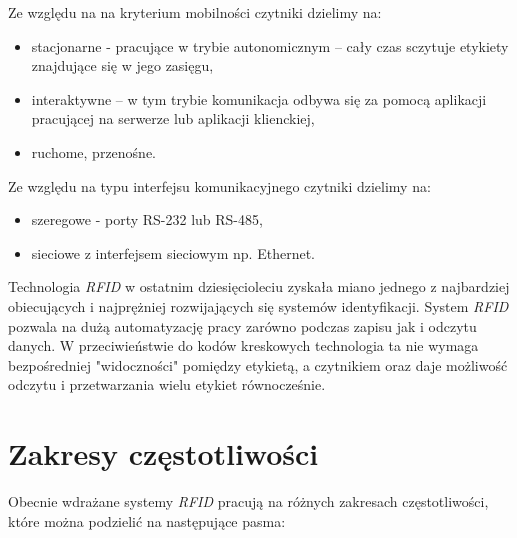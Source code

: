 \noindent 
\newline Ze względu na na kryterium mobilności czytniki dzielimy na:

\begin{itemize}\setlength{\itemsep}{0pt}

	\item stacjonarne - pracujące w trybie autonomicznym – cały czas sczytuje etykiety znajdujące się w jego zasięgu, 

	\item interaktywne – w tym trybie komunikacja odbywa się za pomocą aplikacji pracującej na serwerze lub aplikacji klienckiej, 

	\item ruchome, przenośne.
\end{itemize}




\noindent
\newline Ze względu na typu interfejsu komunikacyjnego czytniki dzielimy na:

\begin{itemize}\setlength{\itemsep}{0pt}

	\item szeregowe - porty RS-232 lub RS-485, 

	\item sieciowe z interfejsem sieciowym np. Ethernet.

\end{itemize}



Technologia \emph{RFID} w ostatnim dziesięcioleciu zyskała miano jednego z najbardziej obiecujących i najprężniej rozwijających się systemów identyfikacji.
System \emph{RFID} pozwala na dużą automatyzację pracy zarówno podczas zapisu jak i odczytu danych. W przeciwieństwie do kodów kreskowych technologia ta nie wymaga bezpośredniej "widoczności" pomiędzy etykietą, a czytnikiem oraz daje możliwość odczytu i przetwarzania wielu etykiet równocześnie.


\section{Zakresy częstotliwości}

Obecnie wdrażane systemy \emph{RFID} pracują na różnych zakresach częstotliwości, które można podzielić na następujące pasma:


